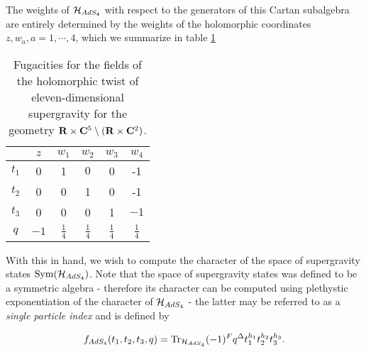 \documentclass[../main.tex]{subfiles}
\begin{document}
The weights of $\mathcal{H}_{AdS_4}$ with respect to the generators of this Cartan subalgebra are entirely determined by the weights of the holomorphic coordinates $z, w_a, a= 1, \cdots, 4$, which we summarize in table \ref{tbl:sugraM2}

\begin{table}
\begin{center}
\begin{tabular}{c c c c c c}
  & $z$ & $w_1$ & $w_2$ & $w_{3}$ & $w_{4}$ \\
  \hline
  $t_{1}$ & 0 & 1 & $0$ & 0 & -1 \\
  $t_{2}$ & 0 & 0 &  1 & 0 & -1 \\
  $t_{3}$ & 0 & 0 & 0 & 1 & $-1$ \\
  $q$ & $-1$ & $\frac14$ & $\frac14$ & $\frac14$ & $\frac14$
\end{tabular}
\caption{Fugacities for the fields of the holomorphic twist of eleven-dimensional supergravity for the geometry $\mathbf{R} \times \mathbf{C}^5 \setminus (\mathbf{R}\times \mathbf{C}^2)$.}
\label{tbl:sugraM2}
\end{center}
\end{table}

With this in hand, we wish to compute the character of the space of supergravity states $\text{Sym} (\mathcal{H}_{AdS_4})$. Note that the space of supergravity states was defined to be a symmetric algebra - therefore its character can be computed using plethystic exponentiation of the character of $\mathcal{H}_{AdS_4}$ - the latter may be referred to as a \textit{single particle index} and is defined by 

\[
f_{AdS_4} (t_1, t_2, t_3, q) = \text{Tr}_{\mathcal{H}_{AdS_4}} (-1)^F q^\Delta t_1^{h_1} t_2^{h_2} t_3^{h_3}.
\]
\end{document}
